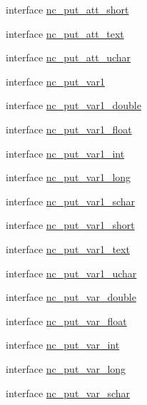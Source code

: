 \begin{DoxyCompactItemize}
\item 
interface \hyperlink{interfacenetcdf__nc__interfaces_1_1nc__put__att__short}{nc\+\_\+put\+\_\+att\+\_\+short}
\item 
interface \hyperlink{interfacenetcdf__nc__interfaces_1_1nc__put__att__text}{nc\+\_\+put\+\_\+att\+\_\+text}
\item 
interface \hyperlink{interfacenetcdf__nc__interfaces_1_1nc__put__att__uchar}{nc\+\_\+put\+\_\+att\+\_\+uchar}
\item 
interface \hyperlink{interfacenetcdf__nc__interfaces_1_1nc__put__var1}{nc\+\_\+put\+\_\+var1}
\item 
interface \hyperlink{interfacenetcdf__nc__interfaces_1_1nc__put__var1__double}{nc\+\_\+put\+\_\+var1\+\_\+double}
\item 
interface \hyperlink{interfacenetcdf__nc__interfaces_1_1nc__put__var1__float}{nc\+\_\+put\+\_\+var1\+\_\+float}
\item 
interface \hyperlink{interfacenetcdf__nc__interfaces_1_1nc__put__var1__int}{nc\+\_\+put\+\_\+var1\+\_\+int}
\item 
interface \hyperlink{interfacenetcdf__nc__interfaces_1_1nc__put__var1__long}{nc\+\_\+put\+\_\+var1\+\_\+long}
\item 
interface \hyperlink{interfacenetcdf__nc__interfaces_1_1nc__put__var1__schar}{nc\+\_\+put\+\_\+var1\+\_\+schar}
\item 
interface \hyperlink{interfacenetcdf__nc__interfaces_1_1nc__put__var1__short}{nc\+\_\+put\+\_\+var1\+\_\+short}
\item 
interface \hyperlink{interfacenetcdf__nc__interfaces_1_1nc__put__var1__text}{nc\+\_\+put\+\_\+var1\+\_\+text}
\item 
interface \hyperlink{interfacenetcdf__nc__interfaces_1_1nc__put__var1__uchar}{nc\+\_\+put\+\_\+var1\+\_\+uchar}
\item 
interface \hyperlink{interfacenetcdf__nc__interfaces_1_1nc__put__var__double}{nc\+\_\+put\+\_\+var\+\_\+double}
\item 
interface \hyperlink{interfacenetcdf__nc__interfaces_1_1nc__put__var__float}{nc\+\_\+put\+\_\+var\+\_\+float}
\item 
interface \hyperlink{interfacenetcdf__nc__interfaces_1_1nc__put__var__int}{nc\+\_\+put\+\_\+var\+\_\+int}
\item 
interface \hyperlink{interfacenetcdf__nc__interfaces_1_1nc__put__var__long}{nc\+\_\+put\+\_\+var\+\_\+long}
\item 
interface \hyperlink{interfacenetcdf__nc__interfaces_1_1nc__put__var__schar}{nc\+\_\+put\+\_\+var\+\_\+schar}

\end{DoxyCompactItemize}
